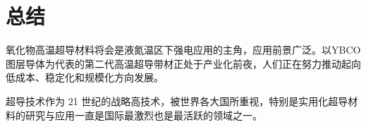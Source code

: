 \documentclass[UTF8, twocolumn]{ctexart}
\begin{document}
\section{总结}

    氧化物高温超导材料将会是液氮温区下强电应用的主角，应用前景广泛。以YBCO图层导体为代表的第二代高温超导带材正处于产业化前夜，人们正在努力推动起向低成本、稳定化和规模化方向发展\cite{马衍伟2015实用化超导材料研究进展与展望}。

    超导技术作为 21 世纪的战略高技术，被世界各大国所重视，特别是实用化超导材料的研究与应用一直是国际最激烈也是最活跃的领域之一。

\kaishu
{}

\end{document}

